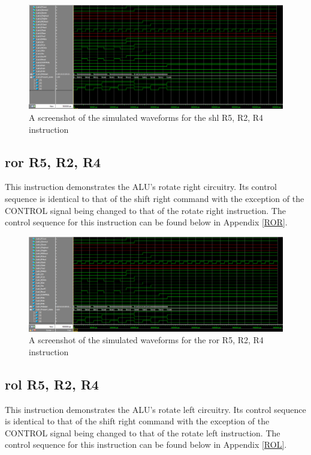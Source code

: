 \documentclass{article}
\begin{document}
    \begin{figure}[h!]
        \begin{center}
            \includegraphics[width=15cm]{shl}
            \caption{A screenshot of the simulated waveforms for the shl R5, R2, R4 instruction}
        \end{center}
    \end{figure}

    \subsection{ror R5, R2, R4}
    This instruction demonstrates the ALU's rotate right circuitry. Its control sequence is identical to that of the shift right command with the exception of the CONTROL signal being changed to that of the rotate right instruction. The control sequence for this instruction can be found below in Appendix \ref{ROR}.

    \begin{figure}[h!]
        \begin{center}
            \includegraphics[width=15cm]{ror}
            \caption{A screenshot of the simulated waveforms for the ror R5, R2, R4 instruction}
        \end{center}
    \end{figure}

    \subsection{rol R5, R2, R4}
    This instruction demonstrates the ALU's rotate left circuitry. Its control sequence is identical to that of the shift right command with the exception of the CONTROL signal being changed to that of the rotate left instruction. The control sequence for this instruction can be found below in Appendix \ref{ROL}.
\end{document}
